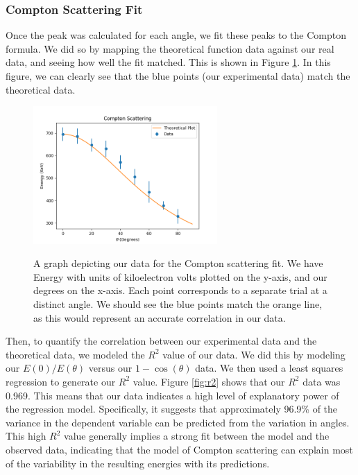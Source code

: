 \documentclass[10pt,letterpaper,onecolumn]{article}
\begin{document}
\subsubsection*{Compton Scattering Fit}
Once the peak was calculated for each angle, we fit these peaks to the Compton formula. We did so by mapping the theoretical function data against our real data, and seeing how well the fit matched. This is shown in Figure \ref{fig:comfit}. In this figure, we can clearly see that the blue points (our experimental data) match the theoretical data. 

\begin{figure}[hbt!]
    \begin{center}
        {{\includegraphics[width=7cm]{ScatteringFit.png} }}%
        \caption{A graph depicting our data for the Compton scattering fit. We have Energy with units of kiloelectron volts plotted on the y-axis, and our degrees on the x-axis. Each point corresponds to a separate trial at a distinct angle. We should see the blue points match the orange line, as this would represent an accurate correlation in our data.}%
        \label{fig:comfit}%
    \end{center}
\end{figure}

Then, to quantify the correlation between our experimental data and the theoretical data, we modeled the $R^{2}$ value of our data. We did this by modeling our $E(0)/E(\theta)$ versus our $1 - \cos(\theta)$ data. We then used a least squares regression to generate our $R^{2}$ value. Figure \ref{fig:r2} shows that our $R^{2}$ data was 0.969. This means that our data indicates a high level of explanatory power of the regression model. Specifically, it suggests that approximately 96.9\% of the variance in the dependent variable can be predicted from the variation in angles. This high \(R^2\) value generally implies a strong fit between the model and the observed data, indicating that the model of Compton scattering can explain most of the variability in the resulting energies with its predictions.
\end{document}
